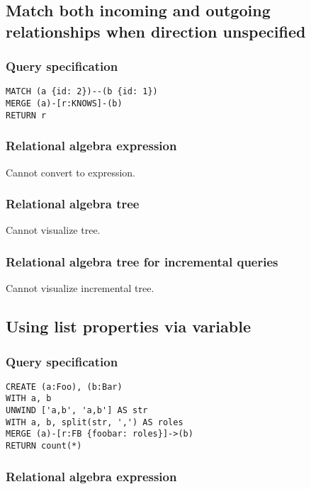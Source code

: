 \subsection{Match both incoming and outgoing relationships when direction unspecified}

\subsubsection*{Query specification}

\begin{lstlisting}
MATCH (a {id: 2})--(b {id: 1})
MERGE (a)-[r:KNOWS]-(b)
RETURN r
\end{lstlisting}

\subsubsection*{Relational algebra expression}

Cannot convert to expression.

\subsubsection*{Relational algebra tree}

Cannot visualize tree.

\subsubsection*{Relational algebra tree for incremental queries}

Cannot visualize incremental tree.

\subsection{Using list properties via variable}

\subsubsection*{Query specification}

\begin{lstlisting}
CREATE (a:Foo), (b:Bar)
WITH a, b
UNWIND ['a,b', 'a,b'] AS str
WITH a, b, split(str, ',') AS roles
MERGE (a)-[r:FB {foobar: roles}]->(b)
RETURN count(*)
\end{lstlisting}

\subsubsection*{Relational algebra expression}

